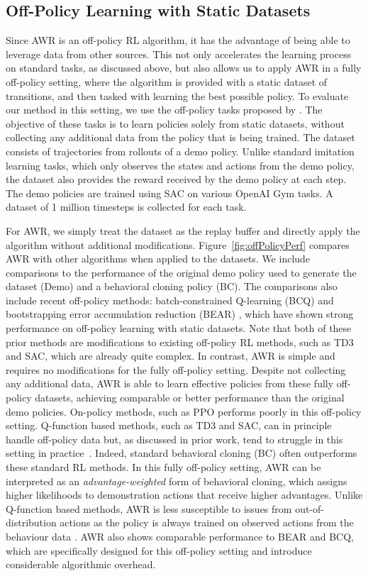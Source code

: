 \documentclass{article} \usepackage{iclr2020_conference,times}
\begin{document}
\subsection{Off-Policy Learning with Static Datasets}

Since AWR is an off-policy RL algorithm, it has the advantage of being able to leverage data from other sources. This not only accelerates the learning process on standard tasks, as discussed above, but also allows us to apply AWR in a fully off-policy setting, where the algorithm is provided with a static dataset of transitions, and then tasked with learning the best possible policy. To evaluate our method in this setting, we use the off-policy tasks proposed by \citet{BEAR2019}. The objective of these tasks is to learn policies solely from static datasets, without collecting any additional data from the policy that is being trained. The dataset consists of trajectories  from rollouts of a demo policy. Unlike standard imitation learning tasks, which only observes the states and actions from the demo policy, the dataset also provides the reward received by the demo policy at each step. The demo policies are trained using SAC on various OpenAI Gym tasks.
A dataset of 1 million timesteps is collected for each task. 

For AWR, we simply treat the dataset as the replay buffer  and directly apply the algorithm without additional modifications. Figure~\ref{fig:offPolicyPerf} compares AWR with other algorithms when applied to the datasets. We include comparisons to the performance of the original demo policy used to generate the dataset (Demo)
and a behavioral cloning policy (BC). The comparisons also include recent off-policy methods: batch-constrained Q-learning (BCQ) \citep{fujimoto19offpolicy} and bootstrapping error accumulation reduction (BEAR) \citep{BEAR2019}, which have shown strong performance on off-policy learning with static datasets.
Note that both of these prior methods are modifications to existing off-policy RL methods, such as TD3 and SAC, which are already quite complex. In contrast, AWR is simple and requires no modifications for the fully off-policy setting.
Despite not collecting any additional data, AWR is able to learn effective policies from these fully off-policy datasets, achieving comparable or better performance than the original demo policies. On-policy methods, such as PPO performs poorly in this off-policy setting. Q-function based methods, such as TD3 and SAC, can in principle handle off-policy data but, as discussed in prior work, tend to struggle in this setting in practice~\citep{fujimoto19offpolicy,BEAR2019}. Indeed, standard behavioral cloning (BC) often outperforms these standard RL methods.
In this fully off-policy setting, AWR can be interpreted as an \emph{advantage-weighted} form of behavioral cloning, which assigns higher likelihoods to demonstration actions that receive higher advantages. Unlike Q-function based methods, AWR is less susceptible to issues from out-of-distribution actions as the policy is always trained on observed actions from the behaviour data \citep{BEAR2019}. AWR also shows comparable performance to BEAR and BCQ, which are specifically designed for this off-policy setting and introduce considerable algorithmic overhead.
\end{document}
